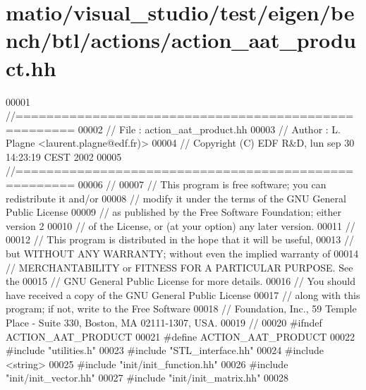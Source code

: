 \hypertarget{matio_2visual__studio_2test_2eigen_2bench_2btl_2actions_2action__aat__product_8hh_source}{}\section{matio/visual\+\_\+studio/test/eigen/bench/btl/actions/action\+\_\+aat\+\_\+product.hh}
\label{matio_2visual__studio_2test_2eigen_2bench_2btl_2actions_2action__aat__product_8hh_source}

\begin{DoxyCode}
00001 \textcolor{comment}{//=====================================================}
00002 \textcolor{comment}{// File   :  action\_aat\_product.hh}
00003 \textcolor{comment}{// Author :  L. Plagne <laurent.plagne@edf.fr)>}
00004 \textcolor{comment}{// Copyright (C) EDF R&D,  lun sep 30 14:23:19 CEST 2002}
00005 \textcolor{comment}{//=====================================================}
00006 \textcolor{comment}{//}
00007 \textcolor{comment}{// This program is free software; you can redistribute it and/or}
00008 \textcolor{comment}{// modify it under the terms of the GNU General Public License}
00009 \textcolor{comment}{// as published by the Free Software Foundation; either version 2}
00010 \textcolor{comment}{// of the License, or (at your option) any later version.}
00011 \textcolor{comment}{//}
00012 \textcolor{comment}{// This program is distributed in the hope that it will be useful,}
00013 \textcolor{comment}{// but WITHOUT ANY WARRANTY; without even the implied warranty of}
00014 \textcolor{comment}{// MERCHANTABILITY or FITNESS FOR A PARTICULAR PURPOSE.  See the}
00015 \textcolor{comment}{// GNU General Public License for more details.}
00016 \textcolor{comment}{// You should have received a copy of the GNU General Public License}
00017 \textcolor{comment}{// along with this program; if not, write to the Free Software}
00018 \textcolor{comment}{// Foundation, Inc., 59 Temple Place - Suite 330, Boston, MA  02111-1307, USA.}
00019 \textcolor{comment}{//}
00020 \textcolor{preprocessor}{#ifndef ACTION\_AAT\_PRODUCT}
00021 \textcolor{preprocessor}{#define ACTION\_AAT\_PRODUCT}
00022 \textcolor{preprocessor}{#include "utilities.h"}
00023 \textcolor{preprocessor}{#include "STL\_interface.hh"}
00024 \textcolor{preprocessor}{#include <string>}
00025 \textcolor{preprocessor}{#include "init/init\_function.hh"}
00026 \textcolor{preprocessor}{#include "init/init\_vector.hh"}
00027 \textcolor{preprocessor}{#include "init/init\_matrix.hh"}
00028 

\end{DoxyCode}
